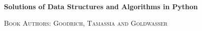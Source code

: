 \newcommand{\HRule}{\rule{\linewidth}{0.2mm}}
\begin{titlepage}
\begin{LOGOWEBPAGE}

\end{LOGOWEBPAGE}
\begin{navbartext}
	\Large \bfseries Solutions of Data Structures and Algorithms in Python
\end{navbartext}
\begin{navbartext}
	\textsc{Book Authors: Goodrich, Tamassia and Goldwasser}
\end{navbartext}
\end{titlepage}